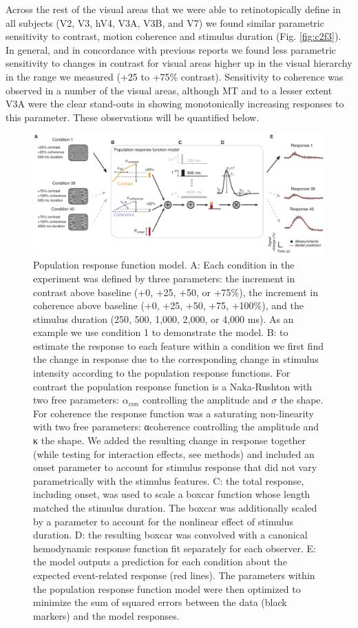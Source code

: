 Across the rest of the visual areas that we were able to retinotopically define in all subjects (V2, V3, hV4, V3A, V3B, and V7) we found similar parametric sensitivity to contrast, motion coherence and stimulus duration (Fig. \ref{fig:c2f3}). In general, and in concordance with previous reports \citep{Avidan2002-jg} we found less parametric sensitivity to changes in contrast for visual areas higher up in the visual hierarchy in the range we measured (+25 to +75\% contrast). Sensitivity to coherence was observed in a number of the visual areas, although MT and to a lesser extent V3A were the clear stand-outs in showing monotonically increasing responses to this parameter. These observations will be quantified below.

\begin{figure}
\centering
\includegraphics[keepaspectratio,width=\textwidth]{figs_c2/Fig4_model.pdf}
\caption[Population response function model]{Population response function model. A: Each condition in the experiment was defined by three parameters: the increment in contrast above baseline (+0, +25, +50, or +75\%), the increment in coherence above baseline (+0, +25, +50, +75, +100\%), and the stimulus duration (250, 500, 1,000, 2,000, or 4,000 ms). As an example we use condition 1 to demonstrate the model. B: to estimate the response to each feature within a condition we first find the change in response due to the corresponding change in stimulus intensity according to the population response functions. For contrast the population response function is a Naka-Rushton with two free parameters: $\alpha_{con}$ controlling the amplitude and $\sigma$ the shape. For coherence the response function was a saturating non-linearity with two free parameters: αcoherence controlling the amplitude and κ the shape. We added the resulting change in response together (while testing for interaction effects, see methods) and included an onset parameter to account for stimulus response that did not vary parametrically with the stimulus features. C: the total response, including onset, was used to scale a boxcar function whose length matched the stimulus duration. The boxcar was additionally scaled by a parameter to account for the nonlinear effect of stimulus duration. D: the resulting boxcar was convolved with a canonical hemodynamic response function fit separately for each observer. E: the model outputs a prediction for each condition about the expected event-related response (red lines). The parameters within the population response function model were then optimized to minimize the sum of squared errors between the data (black markers) and the model responses.}
\label{fig:c2f4}
\end{figure}

